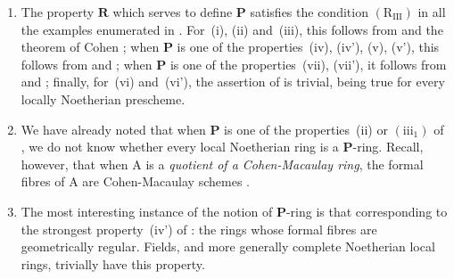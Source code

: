 \begin{remarks}[7.3.19]
\label{IV.7.3.19}
\begin{enumerate}[label=(\roman*)]
  \item The property $\boldsymbol{R}$ which serves to define $\boldsymbol{P}$ satisfies the condition $(\mathrm{R_{III}})$ in all the examples enumerated in .
  For~(i), (ii) and~(iii), this follows from  and the theorem of Cohen ; when $\boldsymbol{P}$ is one of the properties~(iv), (iv'), (v), (v'), this follows from  and ; when $\boldsymbol{P}$ is one of the properties~(vii), (vii'), it follows from  and ; finally, for~(vi) and~(vi'), the assertion of  is trivial, being true for every locally Noetherian prescheme.


  \item We have already noted  that when $\boldsymbol{P}$ is one of the properties~(ii) or $(\mathrm{iii}_1)$ of , we do not know whether every local Noetherian ring is a $\boldsymbol{P}$-ring.
  Recall, however, that when $\mathrm{A}$ is a \emph{quotient of a Cohen-Macaulay ring}, the formal fibres of $\mathrm{A}$ are Cohen-Macaulay schemes .

  \item The most interesting instance of the notion of $\boldsymbol{P}$-ring is that corresponding to the strongest property~(iv') of : the rings whose formal fibres are geometrically regular.
  Fields, and more generally complete Noetherian local rings, trivially have this property.


\end{enumerate}
\end{remarks}
